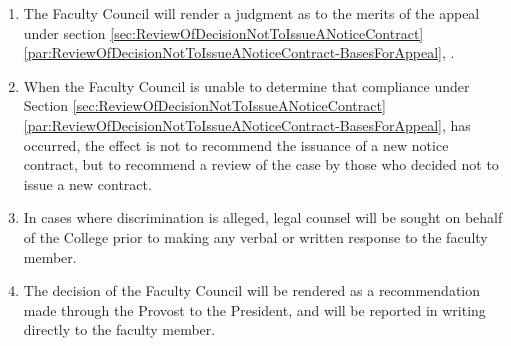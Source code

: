 \begin{enumerate}[label=\alph*)]
{\begin{enumerate}[label=\arabic*)]
						\end{enumerate}
					}
					\item{The Faculty Council will render a judgment as to the merits of the appeal under
						section
						\ref{sec:ReviewOfDecisionNotToIssueANoticeContract}
						\ref{par:ReviewOfDecisionNotToIssueANoticeContract-BasesForAppeal},
						.}
					\item{When the Faculty Council is unable to determine that compliance under
						Section
						\ref{sec:ReviewOfDecisionNotToIssueANoticeContract}
						\ref{par:ReviewOfDecisionNotToIssueANoticeContract-BasesForAppeal},
						has occurred, the effect is not to recommend the issuance of a new notice contract, but to recommend a review of the case by those who decided not to issue a new contract.}
					\item{In cases where discrimination is alleged, legal counsel will be sought on behalf of the College prior to making any verbal or written response to the faculty member.}
					\item{The decision of the Faculty Council will be rendered as a recommendation made through the Provost to the President, and will be reported in writing directly to the faculty member.}
				\end{enumerate}
